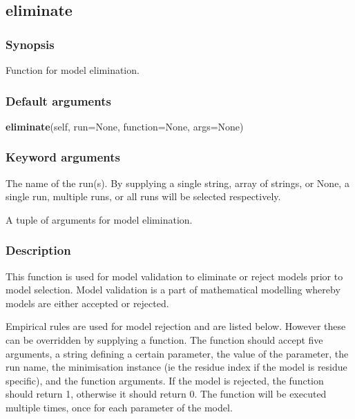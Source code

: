 



\newpage

\subsection{eliminate}


\subsubsection{Synopsis}

Function for model elimination.

\subsubsection{Default arguments}

\textsf{\textbf{eliminate}(self, run=None, function=None, args=None)}


\subsubsection{Keyword arguments}

  The name of the run(s).  By supplying a single string, array of strings, or None, a single run, multiple runs, or all runs will be selected respectively.

  A tuple of arguments for model elimination.

\subsubsection{Description}

This function is used for model validation to eliminate or reject models prior to model
selection.  Model validation is a part of mathematical modelling whereby models are either
accepted or rejected.

Empirical rules are used for model rejection and are listed below.  However these can be
overridden by supplying a function.  The function should accept five arguments, a string
defining a certain parameter, the value of the parameter, the run name, the minimisation
instance (ie the residue index if the model is residue specific), and the function
arguments.  If the model is rejected, the function should return 1, otherwise it should
return 0.  The function will be executed multiple times, once for each parameter of the
model.

